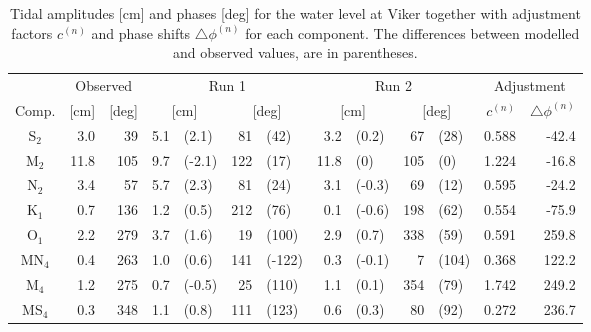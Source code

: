 \begin{table}[ht]
\caption{Tidal amplitudes [cm] and phases [deg] for the water level at Viker  together with adjustment factors $c^{(n)}$ and phase shifts $\triangle \phi^{(n)}$ for each component. The differences between modelled and observed values, are in parentheses.}
\label{tab:Viker}
\centering
\begin{tabular}{crrr@{ }lr@{ }lr@{ }lr@{ }lrr} \hline
      & \multicolumn{2}{c}{Observed} & \multicolumn{4}{c}{Run 1} & \multicolumn{4}{c}{Run 2} & \multicolumn{2}{c}{Adjustment} \\
Comp. & [cm] & [deg] & \multicolumn{2}{c}{[cm]} & \multicolumn{2}{c}{[deg]} & \multicolumn{2}{c}{[cm]} & \multicolumn{2}{c}{[deg]} & $c^{(n)}$ & $\triangle \phi^{(n)}$  \\ \hline 
S$_2$  &   3.0 &  39 &  5.1 & (2.1)  &  81 & (42)   &  3.2 & (0.2)  &  67 & (28)  &  0.588 &   -42.4   \\
M$_2$  &  11.8 & 105 &  9.7 & (-2.1) & 122 & (17)   & 11.8 & (0)    & 105 & (0)   &  1.224 &   -16.8   \\
N$_2$  &   3.4 &  57 &  5.7 & (2.3)  &  81 & (24)   &  3.1 & (-0.3) &  69 & (12)  &  0.595 &   -24.2   \\
K$_1$  &   0.7 & 136 &  1.2 & (0.5)  & 212 & (76)   &  0.1 & (-0.6) & 198 & (62)  &  0.554 &   -75.9   \\
O$_1$  &   2.2 & 279 &  3.7 & (1.6)  &  19 & (100)  &  2.9 & (0.7)  & 338 & (59)  &  0.591 &   259.8   \\
MN$_4$ &   0.4 & 263 &  1.0 & (0.6)  & 141 & (-122) &  0.3 & (-0.1) &   7 & (104) &  0.368 &   122.2   \\
M$_4$  &   1.2 & 275 &  0.7 & (-0.5) &  25 & (110)  &  1.1 & (0.1)  & 354 & (79)  &  1.742 &   249.2   \\
MS$_4$ &   0.3 & 348 &  1.1 & (0.8)  & 111 & (123)  &  0.6 & (0.3)  &  80 & (92)  &  0.272 &   236.7   \\ \hline
\end{tabular}
\end{table}

